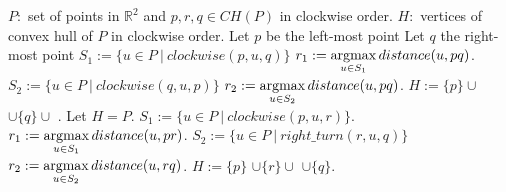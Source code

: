 \noindent\begin{minipage}{.5\textwidth}
\begin{algorithm}[H]
\begin{algorithmic}[1]
    \Require $P: $ set of points in $\mathbb{R}^2$ 
        and $p, r, q \in CH(P)$ in clockwise order.
    \Ensure $H: $ vertices of convex hull of $P$ in clockwise order.
    \State Let $p$ be the left-most point
    \State Let $q$ the right-most point
    \State $S_1 := \{u \in P \ | \ clockwise(p, u, q)\}$
    \State $r_1 := \operatorname*{argmax}\limits_{u \in S_1}distance(u, pq)$.
    \State $S_2 := \{u \in P \ | \ clockwise(q, u, p)\}$
    \State $r_2 := \operatorname*{argmax}\limits_{u \in S_2}distance(u, pq)$.
    \State $H := \{p\} \cup $ 
            $\cup \{q\} \cup$ .
            \State Let $H = P$.
        \Else{}
            \State $S_1 := \{u \in P \ | \ clockwise(p, u, r)\}$.
            \State $r_1 := \operatorname*{argmax}\limits_{u \in S_1}distance(u, pr)$.
            \State $S_2 := \{u \in P \ | \ right\_turn(r, u, q)\}$
            \State $r_2 := \operatorname*{argmax}\limits_{u \in S_2}distance(u, rq)$.
            \State $H := \{p\}$ 
                   $\cup \{r\} \cup$  
                   $\cup \{q\}$.
        \EndIf
    \EndFunction
\end{algorithmic}
\label{alg:quickhull_basic}
\end{algorithm}
\end{minipage}
\hfill
